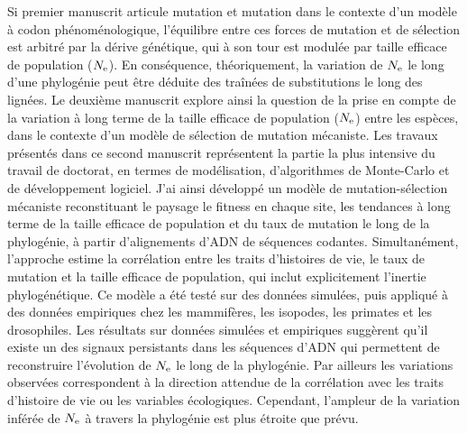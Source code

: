 Si premier manuscrit articule mutation et mutation dans le contexte d'un modèle à codon phénoménologique, l'équilibre entre ces forces de mutation et de sélection est arbitré par la dérive génétique, qui à son tour est modulée par taille efficace de population ($N_{\textrm{e}}$).
En conséquence, théoriquement, la variation de $N_{\textrm{e}}$ le long d'une phylogénie peut être déduite des traînées de substitutions le long des lignées.
Le deuxième manuscrit explore ainsi la question de la prise en compte de la variation à long terme de la taille efficace de population ($N_{\textrm{e}}$) entre les espèces, dans le contexte d'un modèle de sélection de mutation mécaniste.
Les travaux présentés dans ce second manuscrit représentent la partie la plus intensive du travail de doctorat, en termes de modélisation, d'algorithmes de Monte-Carlo et de développement logiciel.
 J'ai ainsi développé un modèle de mutation-sélection mécaniste reconstituant le paysage le fitness en chaque site, les tendances à long terme de la taille efficace de population et du taux de mutation le long de la phylogénie, à partir d’alignements d'ADN de séquences codantes.
Simultanément, l'approche estime la corrélation entre les traits d’histoires de vie, le taux de mutation et la taille efficace de population, qui inclut explicitement l'inertie phylogénétique.
Ce modèle a été testé sur des données simulées, puis appliqué à des données empiriques chez les mammifères, les isopodes, les primates et les drosophiles.
Les résultats sur données simulées et empiriques suggèrent qu'il existe un des signaux persistants dans les séquences d’ADN qui permettent de reconstruire l'évolution de $N_{\textrm{e}}$ le long de la phylogénie.
Par ailleurs les variations observées correspondent à la direction attendue de la corrélation avec les traits d’histoire de vie ou les variables écologiques.
Cependant, l'ampleur de la variation inférée de $N_{\textrm{e}}$ à travers la phylogénie est plus étroite que prévu.

